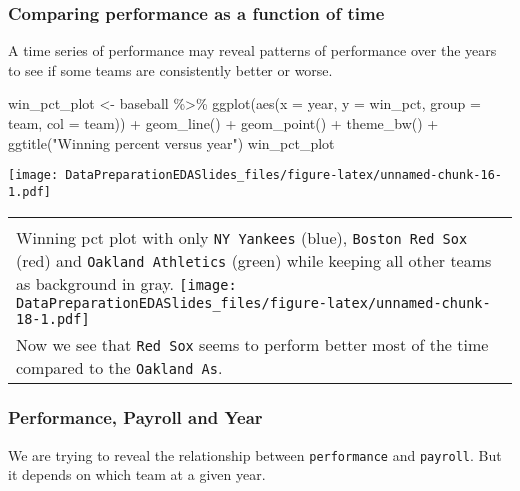 \documentclass[
]{article}
\newenvironment{Shaded}{\begin{snugshade}}{\end{snugshade}}
\newcommand{\AttributeTok}[1]{\textcolor[rgb]{0.77,0.63,0.00}{#1}}
\newcommand{\FunctionTok}[1]{\textcolor[rgb]{0.00,0.00,0.00}{#1}}
\newcommand{\NormalTok}[1]{#1}
\newcommand{\OtherTok}[1]{\textcolor[rgb]{0.56,0.35,0.01}{#1}}
\newcommand{\SpecialCharTok}[1]{\textcolor[rgb]{0.00,0.00,0.00}{#1}}
\newcommand{\StringTok}[1]{\textcolor[rgb]{0.31,0.60,0.02}{#1}}
\begin{document}
\frametitle{Comparing performance as a function of time  }

A time series of performance may reveal patterns of performance over the
years to see if some teams are consistently better or worse. \tiny

\begin{Shaded}
\begin{Highlighting}[]
\NormalTok{win\_pct\_plot }\OtherTok{\textless{}{-}}\NormalTok{ baseball }\SpecialCharTok{\%\textgreater{}\%} 
  \FunctionTok{ggplot}\NormalTok{(}\FunctionTok{aes}\NormalTok{(}\AttributeTok{x =}\NormalTok{ year, }\AttributeTok{y =}\NormalTok{ win\_pct, }\AttributeTok{group =}\NormalTok{ team, }\AttributeTok{col =}\NormalTok{ team)) }\SpecialCharTok{+} 
  \FunctionTok{geom\_line}\NormalTok{() }\SpecialCharTok{+} 
  \FunctionTok{geom\_point}\NormalTok{() }\SpecialCharTok{+}
  \FunctionTok{theme\_bw}\NormalTok{() }\SpecialCharTok{+}
  \FunctionTok{ggtitle}\NormalTok{(}\StringTok{"Winning percent versus year"}\NormalTok{)}
\NormalTok{win\_pct\_plot}
\end{Highlighting}
\end{Shaded}

\texttt{[image: DataPreparationEDASlides\_files/figure-latex/unnamed-chunk-16-1.pdf]}

\begin{longtable}[]{@{}
  >{\raggedright\arraybackslash}p{}@{}}
\toprule
\endhead
 \\
Winning pct plot with only \texttt{NY\ Yankees} (blue),
\texttt{Boston\ Red\ Sox} (red) and \texttt{Oakland\ Athletics} (green)
while keeping all other teams as background in gray.
\texttt{[image: DataPreparationEDASlides\_files/figure-latex/unnamed-chunk-18-1.pdf]} \\
\normalsize Now we see that \texttt{Red\ Sox} seems to perform better
most of the time compared to the
\texttt{Oakland\ A\textquotesingle{}s}. \\
\bottomrule
\end{longtable}

\frametitle{Performance, Payroll and Year}

We are trying to reveal the relationship between \texttt{performance}
and \texttt{payroll}. But it depends on which team at a given year.
\tiny
\end{document}
